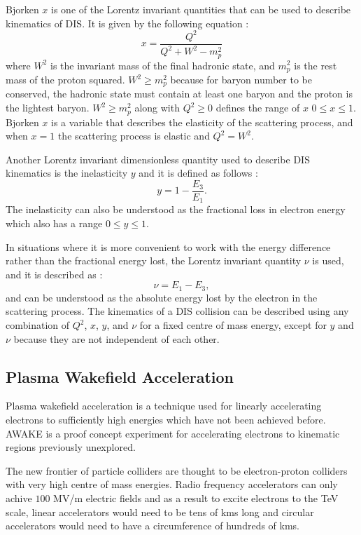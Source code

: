\documentclass[journal, a4paper,10pt]{IEEEtran}
\begin{document}
Bjorken $x$ is one of the Lorentz invariant quantities that can be used to describe kinematics of DIS. It is given by the following equation \cite{Modern}: 
\begin{equation}
	x = \frac{Q^2}{Q^2 + W^2 - m_p^2}
	\label{eq:x}
\end{equation}
where $W^2$ is the invariant mass of the final hadronic state, and $m_p^2$ is the rest mass of the proton squared. $W^2 \geq m_p^2$ because for baryon number to be conserved, the hadronic state must contain at least one baryon and the proton is the lightest baryon. $W^2 \geq m_p^2$ along with $Q^2 \geq 0$ defines the range of $x$ $0 \leq x \leq 1$. Bjorken $x$ is a variable that describes the elasticity of the scattering process, and when $x = 1$ the scattering process is elastic and $Q^2 = W^2$.

Another Lorentz invariant dimensionless quantity used to describe DIS kinematics is the inelasticity $y$ and it is defined as follows \cite{Modern}:
\begin{equation}
	y = 1-\frac{E_3}{E_1}.
	\label{eq:y}
\end{equation}
The inelasticity can also be understood as the fractional loss in electron energy which also has a range $0 \leq y \leq 1$.

In situations where it is more convenient to work with the energy difference rather than the fractional energy lost, the Lorentz invariant quantity $\nu$ is used, and it is described as \cite{Modern}:
\begin{equation}
	\nu = E_1 - E_3,
	\label{eq:nu}
\end{equation}
and can be understood as the absolute energy lost by the electron in the scattering process.
The kinematics of a DIS collision can be described using any combination of $Q^2$, $x$, $y$, and $\nu$ for a fixed centre of mass energy, except for $y$ and $\nu$ because they are not independent of each other.

\subsection*{\textbf{Plasma Wakefield Acceleration}}

Plasma wakefield acceleration is a technique used for linearly accelerating electrons to sufficiently high energies which have not been achieved before. AWAKE \cite{AWAKE1,AWAKE2} is a proof concept experiment for accelerating electrons to kinematic regions previously unexplored.

The new frontier of particle colliders are thought to be electron-proton colliders with very high centre of mass energies. Radio frequency accelerators can only achive $100$ MV/m electric fields \cite{1115} and as a result to excite electrons to the TeV scale, linear accelerators would need to be tens of kms long and circular accelerators would need to have a circumference of hundreds of kms. 
\end{document}
